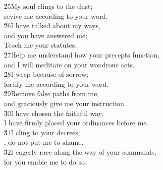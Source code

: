 \begin{poetry}
\poeml \v{25}My soul clings to the dust; \\
\poemll    revive me according to your word. \\
\poeml \v{26}I have talked about my ways, \\
\poemll    and you have answered me; \\
\poemlll       Teach me your statutes. \\
\poeml \v{27}Help me understand how your precepts function, \\
\poemll    and I will meditate on your wondrous acts. \\
\poeml \v{28}I weep because of sorrow; \\
\poemll    fortify me according to your word. \\
\poeml \v{29}Remove false paths from me; \\
\poemll    and graciously give me your instruction. \\
\poeml \v{30}I have chosen the faithful way; \\
\poemll    I have firmly placed your ordinances before me. \\
\poeml \v{31}I cling to your decrees; \\
\poemll    {}, do not put me to shame. \\
\poeml \v{32}I eagerly race along the way of your commands, \\
\poemll    for you enable me to do so.
\end{poetry}

